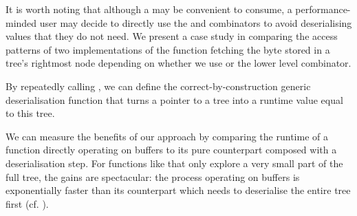 It is worth noting that although a  may be
convenient to consume, a performance-minded user may decide to
directly use the  and 
combinators to avoid deserialising values that they do not need.
%
We present a case study in  comparing the
access patterns of two implementations of the function fetching the
byte stored in a tree's rightmost node depending on whether we use
 or the lower level  combinator.

By repeatedly calling , we can define the
correct-by-construction generic deserialisation function that
turns a pointer to a tree into a runtime value equal to this tree.


We can measure the benefits of our approach by comparing the runtime
of a function directly operating on buffers to its pure counterpart
composed with a deserialisation step.
%
For functions like  that only explore a
very small part of the full tree, the gains are spectacular: the
process operating on buffers is exponentially faster than its
counterpart which needs to deserialise the entire tree first
(cf. ).
